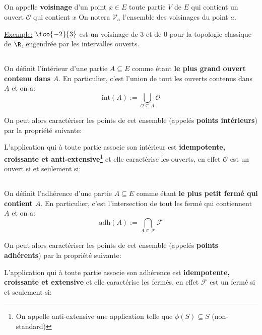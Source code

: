 \subsection*{}
On appelle \textbf{voisinage} d'un point \(x \in E\) toute partie \(V\) de \(E\) qui contient un ouvert \(\mathcal{O}\) qui contient \(x\)
On notera \(\mathscr{V}_a\) l'ensemble des voisinages du point \(a\).\<

\underline{Exemple:} \(\ico{-2}{3}\) est un voisinage de \(3\) et de \(0\) pour la topologie classique de \(\R\), engendrée par les intervalles ouverts.
\subsection*{}
On définit l'intérieur d'une partie \(A \subseteq E\) comme étant \textbf{le plus grand ouvert contenu dans \(A\)}. En particulier, c'est l'union de tout les ouverts contenus dans \(A\) et on a:
\[
    \text{int}(A) := \bigcup_{\mathcal{O} \subseteq{A}}\mathcal{O}
\]

On peut alors caractériser les points de cet ensemble (appelés \textbf{points intérieurs}) par la propriété suivante:

L'application qui à toute partie associe son intérieur est \textbf{idempotente, croissante et anti-extensive}\footnote[2]{On appelle anti-extensive une application telle que \(\phi(S) \subseteq S\) (non-standard)} et elle caractérise les ouverts, en effet \(\mathcal{O}\) est un ouvert si et seulement si:
\subsection*{}
On définit l'adhérence d'une partie \(A \subseteq E\) comme étant \textbf{le plus petit fermé qui contient \(A\)}. En particulier, c'est l'intersection de tout les fermé qui contiennent \(A\) et on a:
\[
    \text{adh}(A) := \bigcap_{A \subseteq \mathcal{F}}\mathcal{F}
\]

On peut alors caractériser les points de cet ensemble (appelés \textbf{points adhérents}) par la propriété suivante:

L'application qui à toute partie associe son adhérence est \textbf{idempotente, croissante et extensive} et elle caractérise les fermés, en effet \(\mathcal{F}\) est un fermé si et seulement si:
